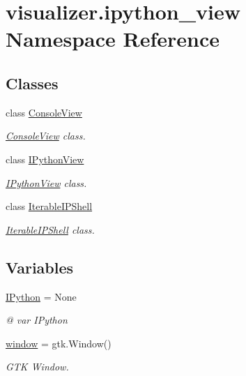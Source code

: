 \hypertarget{namespacevisualizer_1_1ipython__view}{}\section{visualizer.\+ipython\+\_\+view Namespace Reference}
\label{namespacevisualizer_1_1ipython__view}
\subsection*{Classes}
\begin{DoxyCompactItemize}
\item 
class \hyperlink{classvisualizer_1_1ipython__view_1_1ConsoleView}{Console\+View}
\begin{DoxyCompactList}\small\item\em \hyperlink{classvisualizer_1_1ipython__view_1_1ConsoleView}{Console\+View} class. \end{DoxyCompactList}\item 
class \hyperlink{classvisualizer_1_1ipython__view_1_1IPythonView}{I\+Python\+View}
\begin{DoxyCompactList}\small\item\em \hyperlink{classvisualizer_1_1ipython__view_1_1IPythonView}{I\+Python\+View} class. \end{DoxyCompactList}\item 
class \hyperlink{classvisualizer_1_1ipython__view_1_1IterableIPShell}{Iterable\+I\+P\+Shell}
\begin{DoxyCompactList}\small\item\em \hyperlink{classvisualizer_1_1ipython__view_1_1IterableIPShell}{Iterable\+I\+P\+Shell} class. \end{DoxyCompactList}\end{DoxyCompactItemize}
\subsection*{Variables}
\begin{DoxyCompactItemize}
\item 
\hyperlink{namespacevisualizer_1_1ipython__view_a225279206f657edad064bf30c7d69b84}{I\+Python} = None
\begin{DoxyCompactList}\small\item\em @ var I\+Python \end{DoxyCompactList}\item 
\hyperlink{namespacevisualizer_1_1ipython__view_ae2c349e0d13465bcd100c8bad952117f}{window} = gtk.\+Window()
\begin{DoxyCompactList}\small\item\em G\+TK Window. \end{DoxyCompactList}\end{DoxyCompactItemize}


